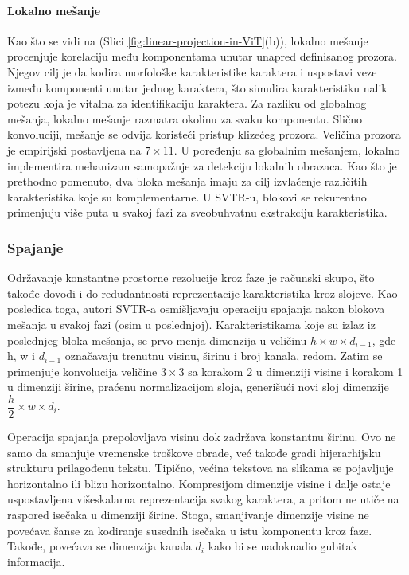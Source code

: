 \documentclass[a4paper,12pt]{article}
\begin{document}
	\paragraph{Lokalno mešanje}
	Kao što se vidi na (Slici \ref{fig:linear-projection-in-ViT}(b)), lokalno mešanje procenjuje korelaciju među komponentama unutar unapred definisanog prozora. Njegov cilj je da kodira morfološke karakteristike karaktera i uspostavi veze između komponenti unutar jednog karaktera, što simulira karakteristiku nalik potezu koja je vitalna za identifikaciju karaktera. Za razliku od globalnog mešanja, lokalno mešanje razmatra okolinu za svaku komponentu. Slično konvoluciji, mešanje se odvija koristeći pristup klizećeg prozora. Veličina prozora je empirijski postavljena na \(7 \times 11\). U poređenju sa globalnim mešanjem, lokalno implementira mehanizam samopažnje za detekciju lokalnih obrazaca. Kao što je prethodno pomenuto, dva bloka mešanja imaju za cilj izvlačenje različitih karakteristika koje su komplementarne. U SVTR-u, blokovi se rekurentno primenjuju više puta u svakoj fazi za sveobuhvatnu ekstrakciju karakteristika.
	
	\subsubsection{Spajanje}
	Održavanje konstantne prostorne rezolucije kroz faze je računski skupo, što takođe dovodi i do redudantnosti reprezentacije karakteristika kroz slojeve. Kao posledica toga, autori SVTR-a osmišljavaju operaciju spajanja nakon blokova mešanja u svakoj fazi (osim u poslednjoj). Karakteristikama koje su izlaz iz poslednjeg bloka mešanja, se prvo menja dimenzija u veličinu \(h \times w \times d_{i-1}\), gde h, w i \(d_{i-1}\) označavaju trenutnu visinu, širinu i broj kanala, redom. Zatim se primenjuje konvolucija veličine \(3 \times 3\) sa korakom 2 u dimenziji visine i korakom 1 u dimenziji širine, praćenu normalizacijom sloja, generišući novi sloj dimenzije \(\dfrac{h}{2} \times w \times d_i\).
	
	Operacija spajanja prepolovljava visinu dok zadržava konstantnu širinu. Ovo ne samo da smanjuje vremenske troškove obrade, već takođe gradi hijerarhijsku strukturu prilagođenu tekstu. Tipično, većina tekstova na slikama se pojavljuje horizontalno ili blizu horizontalno. Kompresijom dimenzije visine i dalje ostaje uspostavljena višeskalarna reprezentacija svakog karaktera, a pritom ne utiče na raspored isečaka u dimenziji širine. Stoga, smanjivanje dimenzije visine ne povećava šanse za kodiranje susednih isečaka u istu komponentu kroz faze. Takođe, povećava se dimenzija kanala \(d_i\) kako bi se nadoknadio gubitak informacija.
	
\end{document}
